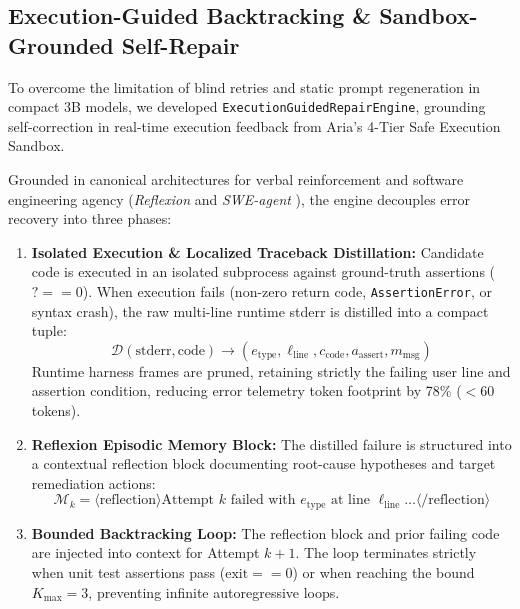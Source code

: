\documentclass[10pt,a4paper]{article}
\begin{document}
\subsection{Execution-Guided Backtracking \& Sandbox-Grounded Self-Repair}
To overcome the limitation of blind retries and static prompt regeneration in compact 3B models, we developed \texttt{ExecutionGuidedRepairEngine}, grounding self-correction in real-time execution feedback from Aria's 4-Tier Safe Execution Sandbox. 

Grounded in canonical architectures for verbal reinforcement and software engineering agency (\textit{Reflexion} \cite{shinn2023reflexion} and \textit{SWE-agent} \cite{yang2024sweagent}), the engine decouples error recovery into three phases:
\begin{enumerate}
    \item \textbf{Isolated Execution \& Localized Traceback Distillation:} Candidate code is executed in an isolated subprocess against ground-truth assertions ($? == 0$). When execution fails (non-zero return code, \texttt{AssertionError}, or syntax crash), the raw multi-line runtime stderr is distilled into a compact tuple:
    \begin{equation}
        \mathcal{D}(\text{stderr}, \text{code}) \to (e_{\text{type}}, \ell_{\text{line}}, c_{\text{code}}, a_{\text{assert}}, m_{\text{msg}})
    \end{equation}
    Runtime harness frames are pruned, retaining strictly the failing user line and assertion condition, reducing error telemetry token footprint by 78\% ($<60$ tokens).
    \item \textbf{Reflexion Episodic Memory Block:} The distilled failure is structured into a contextual reflection block documenting root-cause hypotheses and target remediation actions:
    \begin{equation}
        \mathcal{M}_k = \langle\text{reflection}\rangle\text{Attempt } k \text{ failed with } e_{\text{type}} \text{ at line } \ell_{\text{line}} \dots\langle/\text{reflection}\rangle
    \end{equation}
    \item \textbf{Bounded Backtracking Loop:} The reflection block and prior failing code are injected into context for Attempt $k+1$. The loop terminates strictly when unit test assertions pass ($\text{exit} == 0$) or when reaching the bound $K_{\max} = 3$, preventing infinite autoregressive loops.
\end{enumerate}
\end{document}
